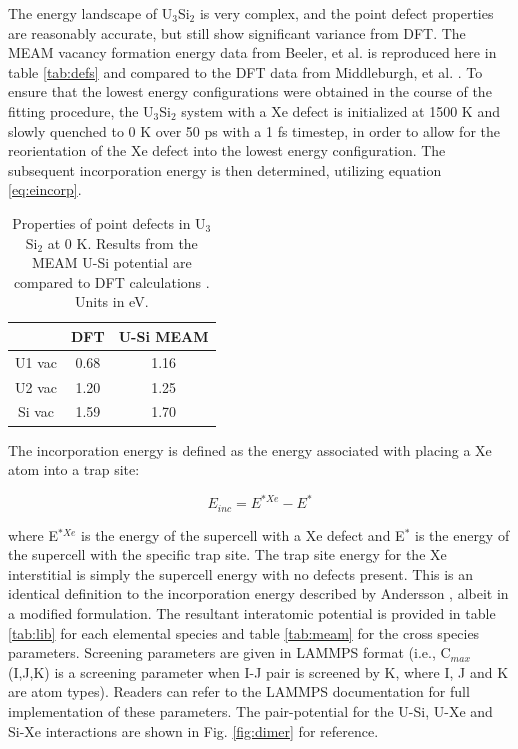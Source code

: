 \documentclass[review]{elsarticle}
\providecommand{\DIFaddtex}[1]{{\protect\color{blue} \sf #1}} %
\providecommand{\DIFaddbegin}{} %
\providecommand{\DIFaddend}{} %
\providecommand{\DIFadd}[1]{\texorpdfstring{\DIFaddtex{#1}}{#1}} %
\newcommand{\DIFaddincludegraphics}[2][]{{\color{blue}\fbox{\DIFOincludegraphics[#1]{#2}}}} %
\DeclareRobustCommand{\DIFaddbegin}{\DIFOaddbegin \let\includegraphics\DIFaddincludegraphics} %
\DeclareRobustCommand{\DIFaddend}{\DIFOaddend \let\includegraphics\DIFOincludegraphics} %
\begin{document}
The energy landscape of U$_3$Si$_2$ is very complex, and the point defect properties are reasonably accurate, but still show significant variance from DFT. The MEAM vacancy formation energy data from Beeler, et al. \cite{beelerusi} is reproduced here in table \ref{tab:defs} and compared to the DFT data from Middleburgh, et al. \cite{middleburgh2016}. To ensure that the lowest energy configurations were obtained in the course of the fitting procedure, the U$_3$Si$_2$ system with a Xe defect is initialized at 1500 K and slowly quenched to 0 K over 50 ps with a 1 fs timestep, in order to allow for the reorientation of the Xe defect into the lowest energy configuration. The subsequent incorporation energy is then determined, utilizing equation \ref{eq:eincorp}. 

\begin{table}[h!]
\caption{Properties of point defects in U$_{3}$Si$_{2}$ at 0 K. Results from the MEAM U-Si potential are compared to DFT calculations \cite{middleburgh2016}. Units in eV.}\label{tab:defs}
\begin{center}
\begin{tabular}{|c|c|c|}
 \hline
 & DFT & U-Si MEAM \\
 \hline
 U1 vac & 0.68 & 1.16 \\
 U2 vac & 1.20 & 1.25 \\
 Si vac & 1.59 & 1.70 \\
 \hline
\end{tabular}
\end{center}
\label{default}
\end{table}%

The incorporation energy is defined as the energy associated with placing a Xe atom into a trap site:

\begin{equation}
\label{eq:eincorp}
E_{inc} = E^{*Xe} - E^*
\end{equation}

where E$^{*Xe}$ is the energy of the supercell with a Xe defect and E$^*$ is the energy of the supercell with the specific trap site. The trap site energy for the Xe interstitial is simply the supercell energy with no defects present. This is an identical definition to the incorporation energy described by Andersson \cite{andersson2018}, albeit in a modified formulation. The resultant interatomic potential is provided in table \ref{tab:lib} for each elemental species and table \ref{tab:meam} for the cross species parameters. Screening parameters are given in LAMMPS format (i.e., C$_{max}$(I,J,K) is a screening parameter when I-J pair is screened by K, where I, J and K are atom types). Readers can refer to the LAMMPS \cite{plimpton1995} documentation for full implementation of these parameters. \DIFaddbegin \DIFadd{The pair-potential for the U-Si, U-Xe and Si-Xe interactions are shown in Fig. \ref{fig:dimer} for reference.
}\DIFaddend 
\end{document}
